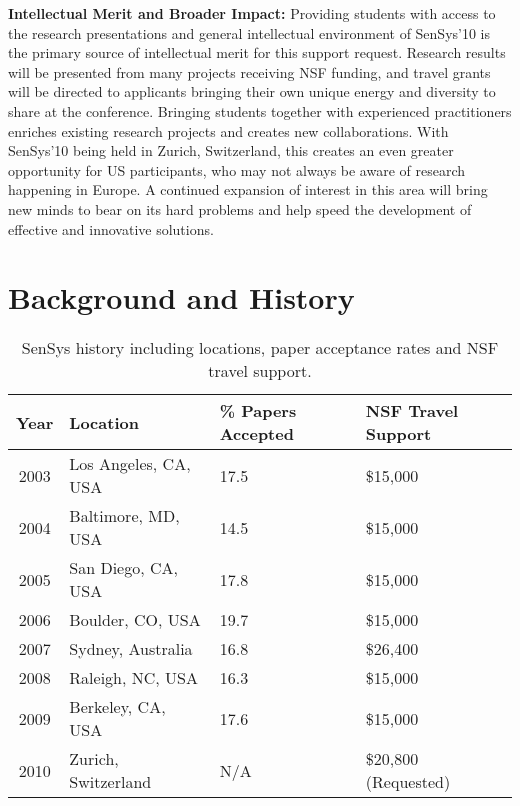 \textbf{Intellectual Merit and Broader Impact:} Providing students with
access to the research presentations and general intellectual environment of
SenSys'10 is the primary source of intellectual merit for this support
request. Research results will be presented from many projects receiving NSF
funding, and travel grants will be directed to applicants bringing their own
unique energy and diversity to share at the conference. Bringing students
together with experienced practitioners enriches existing research projects
and creates new collaborations. With SenSys'10 being held in Zurich,
Switzerland, this creates an even greater opportunity for US participants,
who may not always be aware of research happening in Europe. A continued
expansion of interest in this area will bring new minds to bear on its hard
problems and help speed the development of effective and innovative
solutions.

\vfill\eject

\section{Background and History}

\begin{table}[t]
\begin{center}
\begin{tabular}{|c|lll|}
\hline
\textbf{Year} & \textbf{Location} & \textbf{\% Papers Accepted} & \textbf{NSF
Travel Support} \\
\hline \hline
2003 & Los Angeles, CA, USA & 17.5 & \$15,000 \\
2004 & Baltimore, MD, USA & 14.5 & \$15,000 \\
2005 & San Diego, CA, USA & 17.8 & \$15,000 \\
2006 & Boulder, CO, USA & 19.7 & \$15,000 \\
2007 & Sydney, Australia & 16.8 & \$26,400 \\
2008 & Raleigh, NC, USA & 16.3 & \$15,000 \\
2009 & Berkeley, CA, USA & 17.6 & \$15,000 \\
2010 & Zurich, Switzerland & N/A & \$20,800 (Requested) \\
\hline
\end{tabular}
\end{center}
\caption{SenSys history including locations, paper acceptance rates and
NSF travel support.}
\label{table-history}
\end{table}

